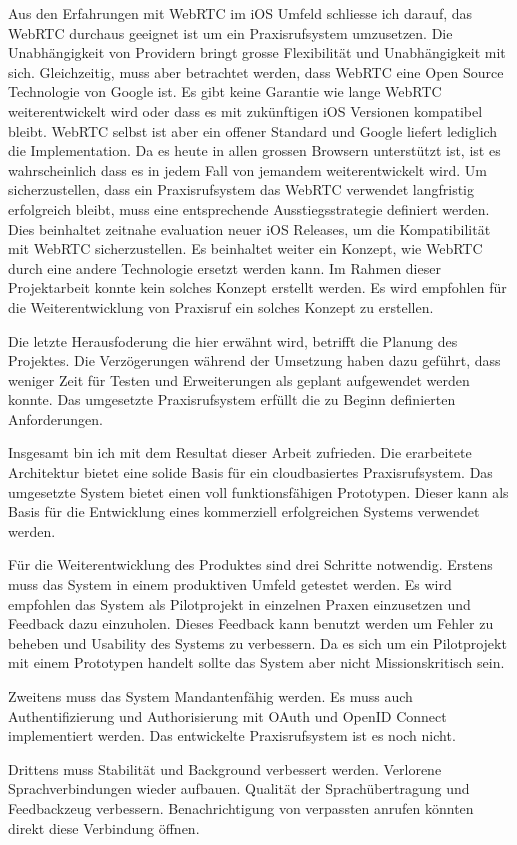 Aus den Erfahrungen mit WebRTC im iOS Umfeld schliesse ich darauf, das WebRTC durchaus geeignet ist um ein Praxisrufsystem umzusetzen.
Die Unabhängigkeit von Providern bringt grosse Flexibilität und Unabhängigkeit mit sich.
Gleichzeitig, muss aber betrachtet werden, dass WebRTC eine Open Source Technologie von Google ist.
Es gibt keine Garantie wie lange WebRTC weiterentwickelt wird oder dass es mit zukünftigen iOS Versionen kompatibel bleibt.
WebRTC selbst ist aber ein offener Standard und Google liefert lediglich die Implementation.
Da es heute in allen grossen Browsern unterstützt ist, ist es wahrscheinlich dass es in jedem Fall von jemandem weiterentwickelt wird.
Um sicherzustellen, dass ein Praxisrufsystem das WebRTC verwendet langfristig erfolgreich bleibt, muss eine entsprechende Ausstiegsstrategie definiert werden.
Dies beinhaltet zeitnahe evaluation neuer iOS Releases, um die Kompatibilität mit WebRTC sicherzustellen.
Es beinhaltet weiter ein Konzept, wie WebRTC durch eine andere Technologie ersetzt werden kann.
Im Rahmen dieser Projektarbeit konnte kein solches Konzept erstellt werden.
Es wird empfohlen für die Weiterentwicklung von Praxisruf ein solches Konzept zu erstellen.

Die letzte Herausfoderung die hier erwähnt wird, betrifft die Planung des Projektes.
Die Verzögerungen während der Umsetzung haben dazu geführt, dass weniger Zeit für Testen und Erweiterungen als geplant aufgewendet werden konnte.
Das umgesetzte Praxisrufsystem erfüllt die zu Beginn definierten Anforderungen.


Insgesamt bin ich mit dem Resultat dieser Arbeit zufrieden.
Die erarbeitete Architektur bietet eine solide Basis für ein cloudbasiertes Praxisrufsystem.
Das umgesetzte System bietet einen voll funktionsfähigen Prototypen.
Dieser kann als Basis für die Entwicklung eines kommerziell erfolgreichen Systems verwendet werden.

Für die Weiterentwicklung des Produktes sind drei Schritte notwendig.
Erstens muss das System in einem produktiven Umfeld getestet werden.
Es wird empfohlen das System als Pilotprojekt in einzelnen Praxen einzusetzen und Feedback dazu einzuholen.
Dieses Feedback kann benutzt werden um Fehler zu beheben und Usability des Systems zu verbessern.
Da es sich um ein Pilotprojekt mit einem Prototypen handelt sollte das System aber nicht Missionskritisch sein.

Zweitens muss das System Mandantenfähig werden.
Es muss auch Authentifizierung und Authorisierung mit OAuth und OpenID Connect implementiert werden.
Das entwickelte Praxisrufsystem ist es noch nicht.

Drittens muss Stabilität und Background verbessert werden.
Verlorene Sprachverbindungen wieder aufbauen.
Qualität der Sprachübertragung und Feedbackzeug verbessern.
Benachrichtigung von verpassten anrufen könnten direkt diese Verbindung öffnen.
